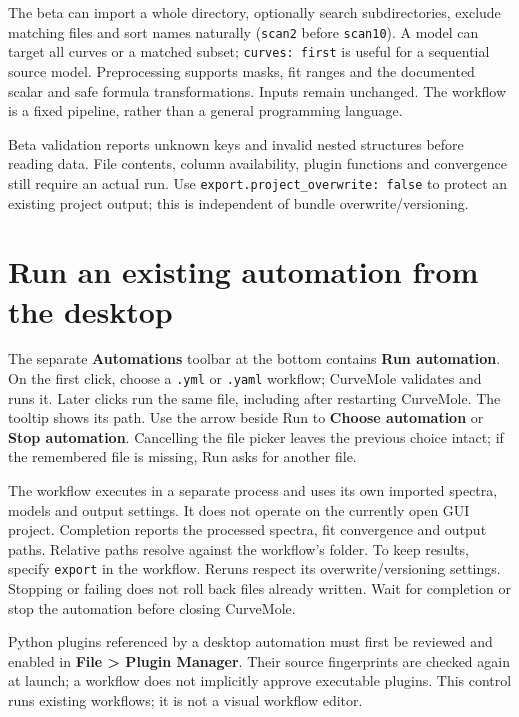 \documentclass[
  10pt,
  a4paper,
  oneside]{scrreprt}
\begin{document}
The beta can import a whole directory, optionally search subdirectories,
exclude matching files and sort names naturally (\texttt{scan2} before
\texttt{scan10}). A model can target all curves or a matched subset;
\texttt{curves:\ first} is useful for a sequential source model.
Preprocessing supports masks, fit ranges and the documented scalar and
safe formula transformations. Inputs remain unchanged. The workflow is a
fixed pipeline, rather than a general programming language.

Beta validation reports unknown keys and invalid nested structures
before reading data. File contents, column availability, plugin
functions and convergence still require an actual run. Use
\texttt{export.project\_overwrite:\ false} to protect an existing
project output; this is independent of bundle overwrite/versioning.

\hypertarget{run-an-existing-automation-from-the-desktop}{%
\section{Run an existing automation from the
desktop}\label{run-an-existing-automation-from-the-desktop}}

The separate \textbf{Automations} toolbar at the bottom contains
\textbf{Run automation}. On the first click, choose a \texttt{.yml} or
\texttt{.yaml} workflow; CurveMole validates and runs it. Later clicks
run the same file, including after restarting CurveMole. The tooltip
shows its path. Use the arrow beside Run to \textbf{Choose automation}
or \textbf{Stop automation}. Cancelling the file picker leaves the
previous choice intact; if the remembered file is missing, Run asks for
another file.

The workflow executes in a separate process and uses its own imported
spectra, models and output settings. It does not operate on the
currently open GUI project. Completion reports the processed spectra,
fit convergence and output paths. Relative paths resolve against the
workflow's folder. To keep results, specify \texttt{export} in the
workflow. Reruns respect its overwrite/versioning settings. Stopping or
failing does not roll back files already written. Wait for completion or
stop the automation before closing CurveMole.

Python plugins referenced by a desktop automation must first be reviewed
and enabled in \textbf{File \textgreater{} Plugin Manager}. Their source
fingerprints are checked again at launch; a workflow does not implicitly
approve executable plugins. This control runs existing workflows; it is
not a visual workflow editor.
\end{document}
